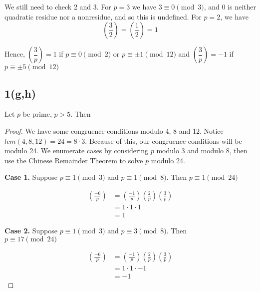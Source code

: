 We still need to check 2 and 3. For $p=3$ we have $3 \equiv 0 \pmod{3}$, and 0
is neither quadratic residue nor a nonresidue, and so this is undefined. For
$p=2$, we have 
\[ \left( \frac{3}{2} \right) = \left( \frac{1}{2} \right) = 1 \]

Hence, $\left( \dfrac{3}{p} \right)  = 1$ if $p \equiv 0 \pmod 2 $ or $p
\equiv \pm 1 \pmod{12}$ and $\left( \dfrac{3}{p} \right)  = -1$ if 
$p \equiv \pm 5 \pmod{12}$


\subsection{1(g,h)}
\begin{lemma}
	Let $p$ be prime, $p > 5$. Then
\end{lemma}
\begin{proof}
We have some congruence conditions modulo 4, 8 and 12. Notice $lcm(4, 8,
12) = 24 = 8 \cdot 3$. Because of this, our congruence conditions will be modulo
24. We enumerate cases by considering $p$ modulo 3 and modulo 8, then use the
Chinese Remainder Theorem to solve $p$ modulo 24.

\textbf{Case 1.}
Suppose $p \equiv 1 \pmod{3}$ and $p \equiv 1 \pmod{8}$. Then 
$p \equiv 1 \pmod{24}$

\begin{align*}
\left( \frac{-6}{p} \right) 
&= \left( \frac{-1}{p} \right) \left( \frac{2}{p} \right) \left( \frac{3}{p} \right) \\
&= 1 \cdot 1 \cdot 1 \\
&= 1
\end{align*}

\textbf{Case 2.}
Suppose $p \equiv 1 \pmod{3}$ and $p \equiv 3 \pmod{8}$. Then \\
$p \equiv 17 \pmod{24}$

\begin{align*}
\left( \frac{-6}{p} \right) 
&= \left( \frac{-1}{p} \right) \left( \frac{2}{p} \right) \left( \frac{3}{p} \right) \\
&= 1 \cdot 1 \cdot -1 \\
&= -1
\end{align*}

\end{proof}
